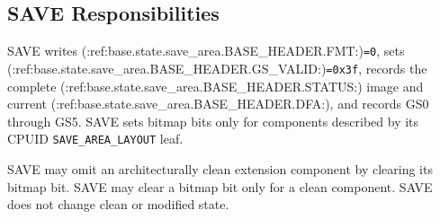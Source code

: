 \subsection{SAVE Responsibilities}
SAVE writes (:ref:base.state.save_area.BASE_HEADER.FMT:)\texttt{=0}, sets (:ref:base.state.save_area.BASE_HEADER.GS_VALID:)\texttt{=0x3f}, records the complete (:ref:base.state.save_area.BASE_HEADER.STATUS:) image and current (:ref:base.state.save_area.BASE_HEADER.DFA:), and records GS0 through GS5. SAVE sets bitmap bits only
for components described by its CPUID \texttt{SAVE\_AREA\_LAYOUT} leaf.

SAVE may omit an architecturally clean extension component by clearing its bitmap bit. SAVE may clear a bitmap bit
only for a clean component. SAVE does not change clean or modified state.
